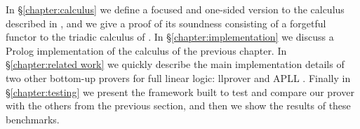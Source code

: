 In \S\ref{chapter:calculus} we define a focused and one-sided version to the calculus described in \cite{HarlandPym}, and we give a proof of its soundness consisting of a forgetful functor to the triadic calculus of \cite{Focusing}.
In \S\ref{chapter:implementation} we discuss a Prolog implementation of the calculus of the previous chapter.
In \S\ref{chapter:related work} we quickly describe the main implementation details of two other bottom-up provers for full linear logic: llprover \cite{llprover} and APLL \cite{APLL}.
Finally in \S\ref{chapter:testing} we present the framework built to test and compare our prover with the others from the previous section, and then we show the results of these benchmarks.

